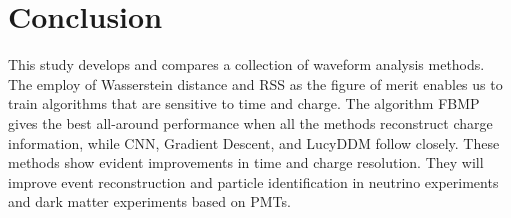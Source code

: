 \section{Conclusion}
\label{sec:conclusion}

This study develops and compares a collection of waveform analysis methods. The employ of Wasserstein distance and RSS as the figure of merit enables us to train algorithms that are sensitive to time and charge. The algorithm FBMP gives the best all-around performance when all the methods reconstruct charge information, while CNN, Gradient Descent, and LucyDDM follow closely. These methods show evident improvements in time and charge resolution. They will improve event reconstruction and particle identification in neutrino experiments and dark matter experiments based on PMTs. 